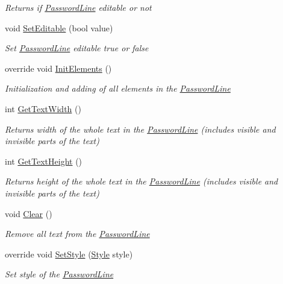 \begin{DoxyCompactItemize}
\begin{DoxyCompactList}\small\item\em Returns if \mbox{\hyperlink{class_space_v_i_l_1_1_password_line}{Password\+Line}} editable or not \end{DoxyCompactList}\item 
void \mbox{\hyperlink{class_space_v_i_l_1_1_password_line_a51ffda354019718ff1118b55d8c6470e}{Set\+Editable}} (bool value)
\begin{DoxyCompactList}\small\item\em Set \mbox{\hyperlink{class_space_v_i_l_1_1_password_line}{Password\+Line}} editable true or false \end{DoxyCompactList}\item 
override void \mbox{\hyperlink{class_space_v_i_l_1_1_password_line_a2cea928d45c4c440435531abacbb5799}{Init\+Elements}} ()
\begin{DoxyCompactList}\small\item\em Initialization and adding of all elements in the \mbox{\hyperlink{class_space_v_i_l_1_1_password_line}{Password\+Line}} \end{DoxyCompactList}\item 
int \mbox{\hyperlink{class_space_v_i_l_1_1_password_line_ac2a6cfda053e0134ab1c139abb7709a3}{Get\+Text\+Width}} ()
\begin{DoxyCompactList}\small\item\em Returns width of the whole text in the \mbox{\hyperlink{class_space_v_i_l_1_1_password_line}{Password\+Line}} (includes visible and invisible parts of the text) \end{DoxyCompactList}\item 
int \mbox{\hyperlink{class_space_v_i_l_1_1_password_line_a6b936fd21b93ef5e5cccc503c8a63c3f}{Get\+Text\+Height}} ()
\begin{DoxyCompactList}\small\item\em Returns height of the whole text in the \mbox{\hyperlink{class_space_v_i_l_1_1_password_line}{Password\+Line}} (includes visible and invisible parts of the text) \end{DoxyCompactList}\item 
void \mbox{\hyperlink{class_space_v_i_l_1_1_password_line_a976403a4d46c253e3568c3642dd56fa1}{Clear}} ()
\begin{DoxyCompactList}\small\item\em Remove all text from the \mbox{\hyperlink{class_space_v_i_l_1_1_password_line}{Password\+Line}} \end{DoxyCompactList}\item 
override void \mbox{\hyperlink{class_space_v_i_l_1_1_password_line_a96f208561afd0f7e997c79fe85aa4d6d}{Set\+Style}} (\mbox{\hyperlink{class_space_v_i_l_1_1_decorations_1_1_style}{Style}} style)
\begin{DoxyCompactList}\small\item\em Set style of the \mbox{\hyperlink{class_space_v_i_l_1_1_password_line}{Password\+Line}} \end{DoxyCompactList}\end{DoxyCompactItemize}
